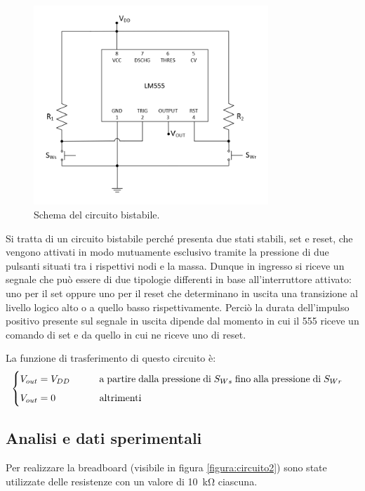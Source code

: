 \documentclass{report}
\begin{document}
\begin{figure}[h!]
	\centering
	\includegraphics[height=7.5cm]{immagini/schema2}
	\caption{Schema del circuito bistabile.}
	\label{figura:schema2}
\end{figure}

\noindent Si tratta di un circuito bistabile perché presenta due stati stabili, set e reset, che vengono attivati in modo mutuamente esclusivo tramite la pressione di due pulsanti situati tra i rispettivi nodi e la massa. Dunque in ingresso si riceve un segnale che può essere di due tipologie differenti in base all'interruttore attivato: uno per il set oppure uno per il reset che determinano in uscita una transizione al livello logico alto o a quello basso rispettivamente. Perciò la durata dell'impulso positivo presente sul segnale in uscita dipende dal momento in cui il 555 riceve un comando di set e da quello in cui ne riceve uno di reset.

La funzione di trasferimento di questo circuito è:
\begin{equation}
	\begin{cases}
		V_{out}= V_{DD}\indent\indent \mathrm{a\;partire\;dalla\;pressione\;di\;} S_{Ws} \mathrm{\;fino\;alla\;pressione\;di\;} S_{Wr}\\[5pt]
		V_{out}= 0\indent\indent\indent \mathrm{altrimenti}\\
	\end{cases}
\end{equation}

\subsection{Analisi e dati sperimentali}
Per realizzare la breadboard (visibile in figura \ref{figura:circuito2}) sono state utilizzate delle resistenze con un valore di \SI{10}{\kilo\ohm} ciascuna.
\end{document}
